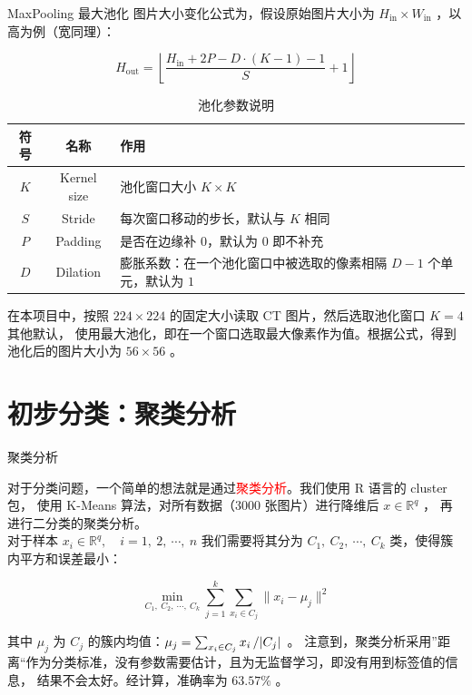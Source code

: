 \documentclass[11pt]{beamer}
\begin{document}
\begin{frame}{MaxPooling 最大池化}{}
\fontsize{9pt}{11pt}\selectfont
图片大小变化公式为，假设原始图片大小为 $H_\text{in} \times W_{\text{in}}$ ，以高为例（宽同理）：

$$
H_\text{out} = \left\lfloor \frac{H_\text{in} + 2P -D \cdot (K - 1) - 1}{S} + 1 \right\rfloor
$$

\begin{table}[h]
  \centering
  \fontsize{9pt}{11pt}\selectfont
  \begin{tabular}{c c p{7.5cm}}  %
  \toprule
  \textbf{符号} & \textbf{名称} & \textbf{作用} \\
  \midrule
    $K$ & Kernel size & 池化窗口大小 $K \times K$ \\
    $S$ & Stride & 每次窗口移动的步长，默认与 $K$ 相同 \\
    $P$ & Padding & 是否在边缘补 $0$，默认为 $0$ 即不补充 \\
    $D$ & Dilation & 膨胀系数：在一个池化窗口中被选取的像素相隔 $D-1$ 个单元，默认为 $1$ \\
  \bottomrule
  \end{tabular}
  \caption{池化参数说明}
\end{table}

在本项目中，按照 $224 \times 224$ 的固定大小读取 CT 图片，然后选取池化窗口 $K = 4$ 其他默认，
使用最大池化，即在一个窗口选取最大像素作为值。根据公式，得到池化后的图片大小为 $56 \times 56$ 。

\end{frame}

\section{初步分类：聚类分析}
\begin{frame}{聚类分析}{}
\fontsize{9pt}{11pt}\selectfont

对于分类问题，一个简单的想法就是通过\textcolor{red}{聚类分析}。我们使用 R 语言的 cluster 包，
使用 K-Means 算法，对所有数据（$3000$ 张图片）进行降维后 $x \in \mathbb{R}^q$ ，
再进行二分类的聚类分析。\\[0.5em]

对于样本 $x_i \in \mathbb{R}^q,\quad i=1,\ 2,\ \cdots,\ n$ 
我们需要将其分为 $C_1,\ C_2,\ \cdots,\ C_k$ 类，使得簇内平方和误差最小：

$$
\min\limits_{C_1,\ C_2,\ \cdots,\ C_k}\sum\limits_{j=1}^k \sum\limits_{x_i \in C_j} \|x_i - \mu_j \|^2
$$

其中 $\mu_j$ 为 $C_j$ 的簇内均值：$\mu_j = \sum_{x_i \in C_j}x_i \left/ |C_j|\right.$ 。
注意到，聚类分析采用”距离“作为分类标准，没有参数需要估计，且为无监督学习，即没有用到标签值的信息，
结果不会太好。经计算，准确率为 $63.57\%$ 。

\end{frame}
\end{document}
